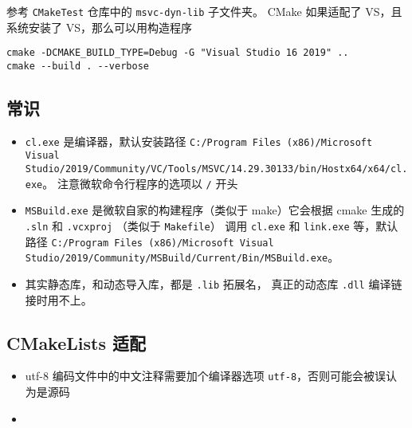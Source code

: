 
参考 \verb`CMakeTest` 仓库中的 \verb`msvc-dyn-lib` 子文件夹。 CMake 如果适配了 VS，且系统安装了 VS，那么可以用构造程序
\begin{lstlisting}[language=none]
cmake -DCMAKE_BUILD_TYPE=Debug -G "Visual Studio 16 2019" ..
cmake --build . --verbose
\end{lstlisting}

\subsection{常识}
\begin{itemize}
\item \verb`cl.exe` 是编译器，默认安装路径 \verb`C:/Program Files (x86)/Microsoft Visual Studio/2019/Community/VC/Tools/MSVC/14.29.30133/bin/Hostx64/x64/cl.exe`。 注意微软命令行程序的选项以 \verb`/` 开头
\item \verb`MSBuild.exe` 是微软自家的构建程序（类似于 make）它会根据 cmake 生成的 \verb`.sln` 和 \verb`.vcxproj` （类似于 \verb`Makefile`） 调用 \verb`cl.exe` 和 \verb`link.exe` 等，默认路径 \verb`C:/Program Files (x86)/Microsoft Visual Studio/2019/Community/MSBuild/Current/Bin/MSBuild.exe`。
\item 其实静态库，和动态导入库，都是 \verb`.lib` 拓展名， 真正的动态库 \verb`.dll` 编译链接时用不上。
\end{itemize}

\subsection{CMakeLists 适配}
\begin{itemize}
\item utf-8 编码文件中的中文注释需要加个编译器选项 \verb`utf-8`，否则可能会被误认为是源码
\item 
\end{itemize}
